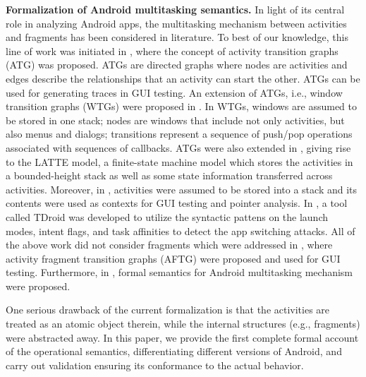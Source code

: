 
\noindent \textbf{Formalization of Android multitasking semantics.}
In light of its central role in  analyzing Android apps, the multitasking mechanism between activities and fragments has been considered in literature. To best of our knowledge, this line of work was initiated in \cite{AN13}, where the concept of activity transition graphs (ATG) was proposed. ATGs are directed graphs where nodes are activities and edges describe the relationships that an activity can start the other. ATGs can be used for generating traces in GUI testing. An extension of ATGs, i.e., window transition graphs (WTGs) were proposed in \cite{YZWWYR15}. In WTGs, windows are assumed to be stored in one stack; nodes are windows that include not only activities, but also menus and dialogs; transitions represent a sequence of push/pop operations associated with sequences of callbacks. 
ATGs were also extended in \cite{YWYZ17}, giving rise to the LATTE model, a finite-state machine model which stores the activities in a bounded-height stack as well as some state information transferred across activities. Moreover, in \cite{ZSX18}, activities were assumed to be stored into a stack and its contents were used as contexts for GUI testing and pointer analysis. In \cite{LWX18}, a tool called TDroid was developed to utilize the syntactic pattens on the launch modes, intent flags, and task affinities to detect the app switching attacks.
All of the above work did not consider fragments which were addressed in \cite{CHGD18}, where activity fragment transition graphs (AFTG) were proposed and used for GUI testing. %
%
Furthermore, in \cite{LHR17,ChenHSWWY18,HCWWY19}, formal semantics for Android multitasking mechanism were proposed.
%

One serious drawback of the current formalization is that the activities are treated as
an atomic object therein, while the internal structures (e.g.,
fragments) were abstracted away. In this paper, we provide the first complete formal account 
of the operational semantics, differentiating different versions of Android, and carry out validation ensuring its conformance to the actual behavior.  

